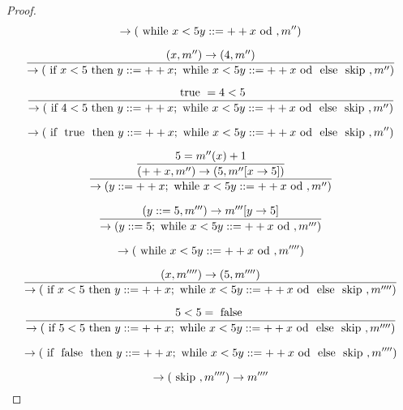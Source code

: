 \begin{enumerate}
\begin{proof}
\[
	\rightarrow (\while x < 5 \do y ::= ++x \od, m'')
\]

\[
	\frac
	{
		(x, m'') \rightarrow (4, m'')
	}
	{
		\rightarrow (\iftext x < 5 \thentext y ::= ++x; \while x < 5 \do y ::= ++x \od \elsetext \skip, m'')
	}
\]

\[
	\frac
	{
		\text{ true } = 4 < 5
	}
	{
		\rightarrow (\iftext 4 < 5 \thentext y ::= ++x; \while x < 5 \do y ::= ++x \od \elsetext \skip, m'')
	}
\]

\[
	\rightarrow (\iftext \text{ true } \thentext y ::= ++x; \while x < 5 \do y ::= ++x \od \elsetext \skip, m'')
\]

\[
	\dfrac
	{
		\dfrac
		{
			5 = m''(x) + 1
		}
		{
			(++x, m'') \rightarrow (5, m''[x \rightarrow 5 ])
		}
	}
	{
		\rightarrow (y::= ++x; \while x < 5 \do y ::= ++x \od, m'')
	}
\]

\[
	\frac
	{
		(y ::= 5, m''') \rightarrow m'''[y \rightarrow 5]
	}
	{
		\rightarrow (y ::= 5; \while x < 5 \do y ::= ++x \od, m''')
	}
\]

\[
	\rightarrow (\while x < 5 \do y ::= ++x \od, m'''')
\]

\def \looptext { \while x < 5 \do y ::= ++x \od }

\[
	\frac
	{
		(x, m'''') \rightarrow (5, m'''')
	}
	{
		\rightarrow (\iftext x < 5 \thentext y ::= ++x; \looptext \elsetext \skip, m'''')
	}
\]

\[
	\frac
	{
		5 < 5 = \text{ false }
	}
	{
		\rightarrow (\iftext 5 < 5 \thentext y ::= ++x; \looptext \elsetext \skip, m'''')
	}
\]

\[
	\rightarrow (\iftext \text{ false } \thentext y ::= ++x; \looptext \elsetext \skip, m'''')
\]

\[
	\rightarrow (\text{ skip }, m'''') \rightarrow m''''
\]

\end{proof}

\end{enumerate}
		



